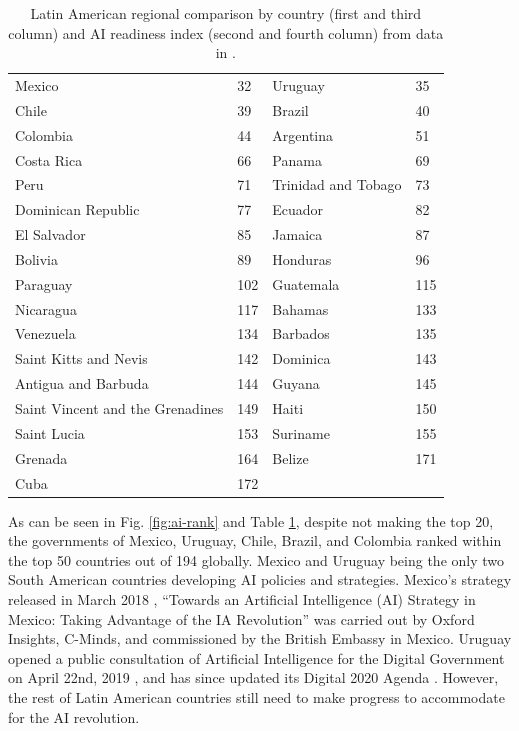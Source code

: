 \documentclass[conference]{IEEEtran}
\begin{document}
\begin{table}[!t]
\caption{Latin American regional comparison by country (first and third column) and AI readiness index (second and fourth column) from data in \cite{miller2019government}.}
\label{tbl:ai-rank}
\centering
\begin{tabular}{|l|l||l|l|}
\hline
Mexico & 32 & Uruguay & 35 \\
Chile & 39 & Brazil & 40 \\
Colombia & 44 & Argentina & 51 \\
Costa Rica & 66 & Panama & 69 \\ 
Peru & 71 & Trinidad and Tobago & 73 \\
Dominican Republic & 77 & Ecuador & 82 \\
El Salvador & 85 & Jamaica & 87 \\     
Bolivia & 89 & Honduras & 96 \\  
Paraguay & 102 & Guatemala & 115 \\    
Nicaragua & 117 & Bahamas & 133 \\     
Venezuela & 134 & Barbados & 135 \\    
Saint Kitts and Nevis & 142 & Dominica & 143 \\
Antigua and Barbuda & 144 & Guyana & 145 \\    
Saint Vincent and the Grenadines & 149 & Haiti & 150 \\
Saint Lucia & 153 & Suriname & 155 \\
Grenada & 164 & Belize & 171 \\
Cuba & 172 & & \\
\hline
\end{tabular}
\end{table}

As can be seen in Fig. \ref{fig:ai-rank} and Table \ref{tbl:ai-rank}, despite not making the top 20, the governments of Mexico, Uruguay, Chile, Brazil, and Colombia ranked within the top 50 countries out of 194 globally. Mexico and Uruguay being the only two South American countries developing AI policies and strategies. Mexico's strategy released in March 2018 \cite{martinho2018mexico}, ``Towards an Artificial Intelligence (AI) Strategy in Mexico: Taking Advantage of the IA Revolution'' was carried out by Oxford Insights, C-Minds, and commissioned by the British Embassy in Mexico. Uruguay opened a public consultation of Artificial Intelligence for the Digital Government on April 22nd, 2019 \cite{uruguay2019inteligencia}, and has since updated its Digital 2020 Agenda \cite{uruguay2019agenda}. However, the rest of Latin American countries still need to make progress to accommodate for the AI revolution.
\end{document}
